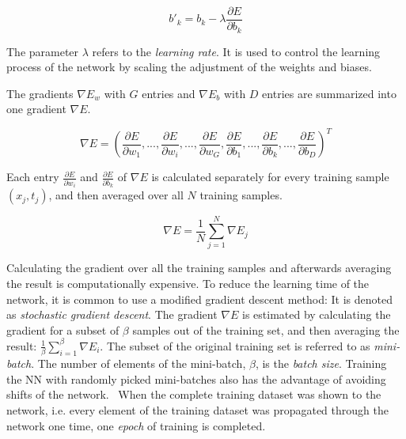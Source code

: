 \begin{equation}
b'_k = b_k - \lambda \frac{\partial E}{\partial b_k}  
\label{eq:update_bias}
\end{equation}

The parameter $\lambda$ refers to the \emph{learning rate}. It is used to control the learning process of the network by scaling the adjustment of the weights and biases. %

The gradients $\nabla E_{w}$ with $G$ entries and $\nabla E_{b}$ with $D$ entries are summarized into one gradient $\nabla E$. 

\begin{equation}
\nabla E = \left(\frac{\partial E}{\partial w_1},..., \frac{\partial E}{\partial w_i}, ... ,\frac{\partial E}{\partial w_G},\frac{\partial E}{\partial b_1}, ..., \frac{\partial E}{\partial b_k}, ..., \frac{\partial E}{\partial b_D}\right)^T
\label{eq:nabla_L}
\end{equation}

Each entry $\frac{\partial E}{\partial w_i}$ and $\frac{\partial E}{\partial b_k}$ of $\nabla E$ is calculated separately for every training sample $(x_j,t_j)$, and then averaged over all $N$ training samples.

\begin{equation}
\nabla E = \frac{1}{N} \sum_{j=1}^{N} \nabla E_j
\label{eq:mean_nabla_L}
\end{equation}

Calculating the gradient over all the training samples and afterwards averaging the result is computationally expensive. 
To reduce the learning time of the network, it is common to use a modified gradient descent method: It is denoted as \emph{stochastic gradient descent}. %
The gradient $\nabla E$ is estimated by calculating the gradient for a subset of $\beta$ samples out of the training set, and then averaging the result: $\frac{1}{\beta} \sum_{i=1}^\beta \nabla E_i$.
The subset of the original training set is referred to as \emph{mini-batch}. The number of elements of the mini-batch, $\beta$, is the \emph{batch size}. Training the NN with randomly picked mini-batches also has the advantage of avoiding shifts of the network.~\cite{batch_normaliz2015ioffe}
When the complete training dataset was shown to the network, i.e. every element of the training dataset was propagated through the network one time, one \emph{epoch} of training is completed.

